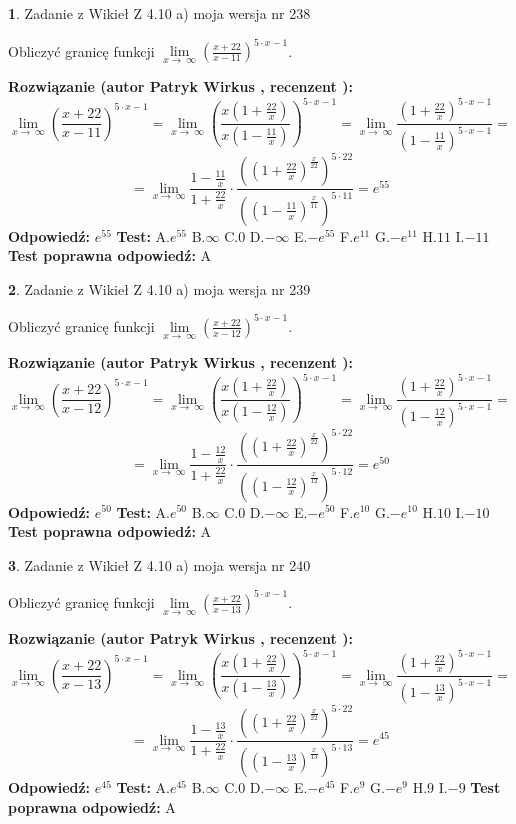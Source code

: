 \documentclass[12pt, a4paper]{article}
\theoremstyle{definition} %
\newtheorem{zad}{}
\newcommand{\zadStart}[1]{\begin{zad}#1\newline}
\newcommand{\zadStop}{\end{zad}}
\newcommand{\rozwStart}[2]{\noindent \textbf{Rozwiązanie (autor #1 , recenzent #2): }\newline}
\newcommand{\rozwStop}{\newline}
\newcommand{\odpStart}{\noindent \textbf{Odpowiedź:}\newline}
\newcommand{\odpStop}{\newline}
\newcommand{\testStart}{\noindent \textbf{Test:}\newline}
\newcommand{\testStop}{\newline}
\newcommand{\kluczStart}{\noindent \textbf{Test poprawna odpowiedź:}\newline}
\newcommand{\kluczStop}{\newline}
\begin{document}
\zadStart{Zadanie z Wikieł Z 4.10 a) moja wersja nr 238}

Obliczyć granicę funkcji  $\lim\limits_{x\to\ \infty}(\frac{x+22}{x-11})^{5\cdot x-1}$.
\zadStop
\rozwStart{Patryk Wirkus}{}
$$\lim\limits_{x\to\ \infty}(\frac{x+22}{x-11})^{5\cdot x-1} = \lim\limits_{x\to\ \infty}(\frac{x(1+\frac{22}{x})}{x(1-\frac{11}{x})})^{5\cdot x-1}=\lim\limits_{x\to\ \infty}\frac{(1+\frac{22}{x})^{5\cdot x-1}}{(1-\frac{11}{x})^{5\cdot x-1}}=$$
$$=\lim\limits_{x\to\ \infty}\frac{1-\frac{11}{x}}{1+\frac{22}{x}}\cdot\frac{((1+\frac{22}{x})^{\frac{x}{22}})^{5\cdot22}}{((1-\frac{11}{x})^{\frac{x}{11}})^{5\cdot11}}=e^{55}$$
\rozwStop
\odpStart
$e^{55}$
\odpStop
\testStart
A.$e^{55}$ B.$\infty$ C.$0$ D.$-\infty$ E.$-e^{55}$
F.$e^{11}$ G.$-e^{11}$
H.$11$
I.$-11$
\testStop
\kluczStart
A
\kluczStop



\zadStart{Zadanie z Wikieł Z 4.10 a) moja wersja nr 239}

Obliczyć granicę funkcji  $\lim\limits_{x\to\ \infty}(\frac{x+22}{x-12})^{5\cdot x-1}$.
\zadStop
\rozwStart{Patryk Wirkus}{}
$$\lim\limits_{x\to\ \infty}(\frac{x+22}{x-12})^{5\cdot x-1} = \lim\limits_{x\to\ \infty}(\frac{x(1+\frac{22}{x})}{x(1-\frac{12}{x})})^{5\cdot x-1}=\lim\limits_{x\to\ \infty}\frac{(1+\frac{22}{x})^{5\cdot x-1}}{(1-\frac{12}{x})^{5\cdot x-1}}=$$
$$=\lim\limits_{x\to\ \infty}\frac{1-\frac{12}{x}}{1+\frac{22}{x}}\cdot\frac{((1+\frac{22}{x})^{\frac{x}{22}})^{5\cdot22}}{((1-\frac{12}{x})^{\frac{x}{12}})^{5\cdot12}}=e^{50}$$
\rozwStop
\odpStart
$e^{50}$
\odpStop
\testStart
A.$e^{50}$ B.$\infty$ C.$0$ D.$-\infty$ E.$-e^{50}$
F.$e^{10}$ G.$-e^{10}$
H.$10$
I.$-10$
\testStop
\kluczStart
A
\kluczStop



\zadStart{Zadanie z Wikieł Z 4.10 a) moja wersja nr 240}

Obliczyć granicę funkcji  $\lim\limits_{x\to\ \infty}(\frac{x+22}{x-13})^{5\cdot x-1}$.
\zadStop
\rozwStart{Patryk Wirkus}{}
$$\lim\limits_{x\to\ \infty}(\frac{x+22}{x-13})^{5\cdot x-1} = \lim\limits_{x\to\ \infty}(\frac{x(1+\frac{22}{x})}{x(1-\frac{13}{x})})^{5\cdot x-1}=\lim\limits_{x\to\ \infty}\frac{(1+\frac{22}{x})^{5\cdot x-1}}{(1-\frac{13}{x})^{5\cdot x-1}}=$$
$$=\lim\limits_{x\to\ \infty}\frac{1-\frac{13}{x}}{1+\frac{22}{x}}\cdot\frac{((1+\frac{22}{x})^{\frac{x}{22}})^{5\cdot22}}{((1-\frac{13}{x})^{\frac{x}{13}})^{5\cdot13}}=e^{45}$$
\rozwStop
\odpStart
$e^{45}$
\odpStop
\testStart
A.$e^{45}$ B.$\infty$ C.$0$ D.$-\infty$ E.$-e^{45}$
F.$e^{9}$ G.$-e^{9}$
H.$9$
I.$-9$
\testStop
\kluczStart
A
\kluczStop
\end{document}
